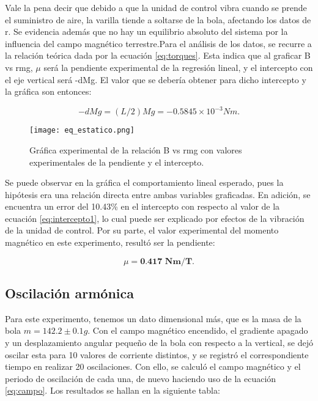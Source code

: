 \documentclass[%
 reprint,
 amsmath,amssymb,
 aps,
]{revtex4-1}
\begin{document}
Vale la pena decir que debido a que la unidad de control vibra cuando se prende el suministro de aire, la varilla tiende a soltarse de la bola, afectando los datos de r. Se evidencia además que no hay un equilibrio absoluto del sistema por la influencia del campo magnético terrestre.Para el análisis de los datos, se recurre a la relación teórica dada por la ecuación \ref{eq:torques}. Esta indica que al graficar B vs rmg, $\mu$ será la pendiente experimental de la regresión lineal, y el intercepto con el eje vertical será -dMg. El valor que se debería obtener para dicho intercepto y la gráfica son entonces:

\begin{equation}
    -dMg=(L/2)Mg=-0.5845\times10^{-3}Nm.
    \label{eq:intercepto1}
\end{equation}

\begin{figure}[H]
    \centering
    \texttt{[image: eq\_estatico.png]}
    \caption{Gráfica experimental de la relación B vs rmg con valores experimentales de la pendiente y el intercepto.}
    \label{fig:grafica1}
\end{figure}

Se puede observar en la gráfica el comportamiento lineal esperado, pues la hipótesis era una relación directa entre ambas variables graficadas. En adición, se encuentra un error del 10.43\% en el intercepto con respecto al valor de la ecuación \ref{eq:intercepto1}, lo cual puede ser explicado por efectos de la vibración de la unidad de control. Por su parte, el valor experimental del momento magnético en este experimento, resultó ser la pendiente:

\begin{equation*}
    \mu=\textbf{0.417 Nm/T}.
\end{equation*}


\subsection{Oscilación armónica}

Para este experimento, tenemos un dato dimensional más, que es la masa de la bola $m = 142.2 \pm 0.1 g$. Con el campo magnético encendido, el gradiente apagado y un desplazamiento angular pequeño de la bola con respecto a la vertical, se dejó oscilar esta para 10 valores de corriente distintos, y se registró el correspondiente tiempo en realizar 20 oscilaciones. Con ello, se calculó el campo magnético y el periodo de oscilación de cada una, de nuevo haciendo uso de la ecuación \ref{eq:campo}. Los resultados se hallan en la siguiente tabla:
\end{document}
